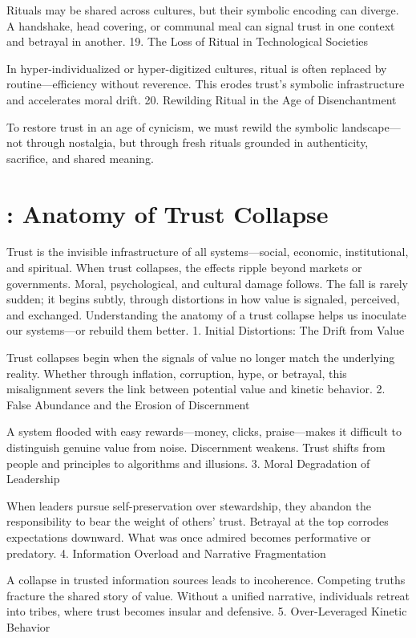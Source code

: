 \documentclass[11pt,oneside]{book}
\begin{document}
Rituals may be shared across cultures, but their symbolic encoding can diverge. A handshake, head covering, or communal meal can signal trust in one context and betrayal in another.
19. The Loss of Ritual in Technological Societies

In hyper-individualized or hyper-digitized cultures, ritual is often replaced by routine—efficiency without reverence. This erodes trust’s symbolic infrastructure and accelerates moral drift.
20. Rewilding Ritual in the Age of Disenchantment

To restore trust in an age of cynicism, we must rewild the symbolic landscape—not through nostalgia, but through fresh rituals grounded in authenticity, sacrifice, and shared meaning.


\chapter{: Anatomy of Trust Collapse}

Trust is the invisible infrastructure of all systems—social, economic, institutional, and spiritual. When trust collapses, the effects ripple beyond markets or governments. Moral, psychological, and cultural damage follows. The fall is rarely sudden; it begins subtly, through distortions in how value is signaled, perceived, and exchanged. Understanding the anatomy of a trust collapse helps us inoculate our systems—or rebuild them better.
1. Initial Distortions: The Drift from Value

Trust collapses begin when the signals of value no longer match the underlying reality. Whether through inflation, corruption, hype, or betrayal, this misalignment severs the link between potential value and kinetic behavior.
2. False Abundance and the Erosion of Discernment

A system flooded with easy rewards—money, clicks, praise—makes it difficult to distinguish genuine value from noise. Discernment weakens. Trust shifts from people and principles to algorithms and illusions.
3. Moral Degradation of Leadership

When leaders pursue self-preservation over stewardship, they abandon the responsibility to bear the weight of others’ trust. Betrayal at the top corrodes expectations downward. What was once admired becomes performative or predatory.
4. Information Overload and Narrative Fragmentation

A collapse in trusted information sources leads to incoherence. Competing truths fracture the shared story of value. Without a unified narrative, individuals retreat into tribes, where trust becomes insular and defensive.
5. Over-Leveraged Kinetic Behavior
\end{document}

